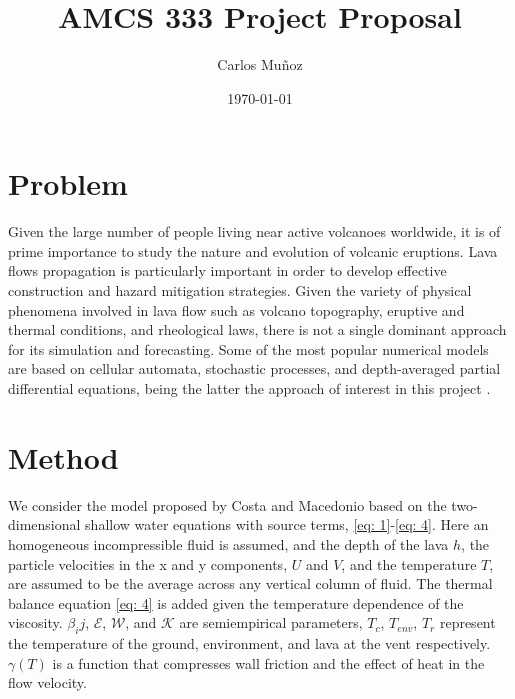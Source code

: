 \documentclass[12pt]{extarticle}
\title{AMCS 333 Project Proposal}
\author{Carlos Muñoz}
\date{\today}
\begin{document}
\maketitle

\section{Problem}
Given the large number of people living near active volcanoes worldwide, it is of prime importance to study the nature and evolution of volcanic eruptions. Lava flows propagation is particularly  important in order to develop effective construction and hazard mitigation strategies. Given the variety of physical phenomena involved in lava flow such as volcano topography, eruptive and thermal conditions, and rheological laws, there is not a single dominant approach for its simulation and forecasting. Some of the most popular numerical models are based on cellular automata, stochastic processes, and depth-averaged partial differential equations, being the latter the approach of interest in this project \cite{cordonnier2016benchmarking}.


\section{Method}

We consider the model proposed by Costa and Macedonio \cite{costa2005numerical} based on the two-dimensional shallow water equations with source terms, \eqref{eq: 1}-\eqref{eq: 4}. Here an homogeneous incompressible fluid is assumed, and the depth of the lava $h$, the particle velocities in the x and y components, $U$ and $V$, and the temperature $T$, are assumed to be the average across any vertical column of fluid. The thermal balance equation \eqref{eq: 4} is added given the temperature dependence of the viscosity. $\beta_ij$, $\mathcal{E}$, $\mathcal{W}$, and $\mathcal{K}$ are semiempirical parameters, $T_c$, $T_{env}$, $T_{r}$ represent the temperature of the ground, environment, and lava at the vent respectively. $\gamma(T)$ is a function that compresses wall friction and the effect of heat in the flow velocity.
\end{document}
